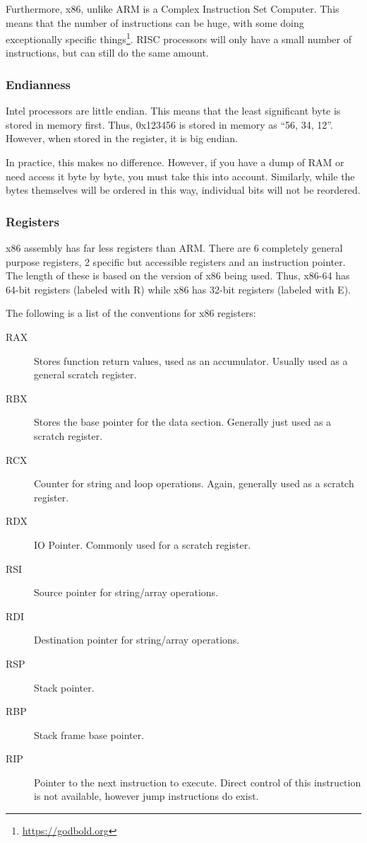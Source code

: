 			Furthermore, x86, unlike ARM is a Complex Instruction Set Computer.
			This means that the number of instructions can be huge, with some doing exceptionally specific things\footnote{\url{https://godbold.org}}.
			RISC processors will only have a small number of instructions, but can still do the same amount.

			\subsubsection{Endianness}
				Intel processors are little endian.
				This means that the least significant byte is stored in memory first.
				Thus, 0x123456 is stored in memory as ``56, 34, 12''.
				However, when stored in the register, it is big endian.

				In practice, this makes no difference.
				However, if you have a dump of RAM or need access it byte by byte, you must take this into account.
				Similarly, while the bytes themselves will be ordered in this way, individual bits will not be reordered.

			\subsubsection{Registers}
				x86 assembly has far less registers than ARM.
				There are 6 completely general purpose registers, 2 specific but accessible registers and an instruction pointer.
				The length of these is based on the version of x86 being used.
				Thus, x86-64 has 64-bit registers (labeled with R) while x86 has 32-bit registers (labeled with E).

				The following is a list of the conventions for x86 registers:
				\begin{description}
					\item[RAX] Stores function return values, used as an accumulator. Usually used as a general scratch register.
					\item[RBX] Stores the base pointer for the data section. Generally just used as a scratch register.
					\item[RCX] Counter for string and loop operations. Again, generally used as a scratch register.
					\item[RDX] IO Pointer. Commonly used for a scratch register.
					\item[RSI] Source pointer for string/array operations.
					\item[RDI] Destination pointer for string/array operations.
					\item[RSP] Stack pointer.
					\item[RBP] Stack frame base pointer.
					\item[RIP] Pointer to the next instruction to execute.
						Direct control of this instruction is not available, however jump instructions do exist.
				\end{description}

